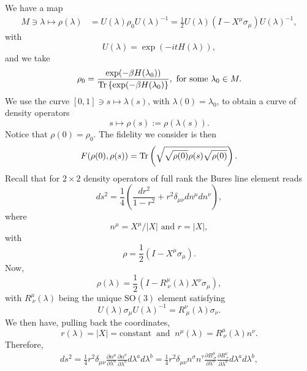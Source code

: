 We have a map
\begin{eqnarray*}
M\ni \lambda\mapsto \rho(\lambda)&=U(\lambda)\rho_0U(\lambda)^{-1}=\frac{1}{2}U(\lambda)\left(I -X^\mu\sigma_\mu\right)U(\lambda)^{-1},
\end{eqnarray*}
with
\begin{equation*}
U(\lambda)=\exp(-itH(\lambda)),
\end{equation*}
and we take
\begin{equation*}
\rho_0=\frac{\exp(-\beta H(\lambda_{0}))}{\text{Tr}\left\{\exp(-\beta H(\lambda_{0})\right\}}, \text{ for some }\lambda_0\in M.
\end{equation*}
We use the curve $[0,1] \ni s\mapsto \lambda(s)$, with $\lambda(0)=\lambda_0$, to obtain a curve of density operators
\begin{equation*}
s\mapsto \rho(s):=\rho(\lambda(s)).
\end{equation*}
Notice that $\rho(0)=\rho_0$. The fidelity we consider is then
\begin{equation*}
F(\rho(0),\rho(s))=\text{Tr}\left(\sqrt{\sqrt{\rho(0)}\rho(s)\sqrt{\rho(0)}}\right).	
\end{equation*}
Recall that for $2\times 2$ density operators of full rank the Bures line element reads
\begin{equation*}
ds^2=\frac{1}{4}\left(\frac{dr^2}{1-r^2}+ r^2 \delta_{\mu\nu} dn^{\mu}dn^{\nu}\right),
\end{equation*}
where
\begin{equation*}
n^{\mu}=X^{\mu}/|X| \text{ and } r=|X|,
\end{equation*}
with
\begin{equation*}
\rho= \frac{1}{2}\left(I-X^{\mu}\sigma_\mu\right).
\end{equation*}
Now,
\begin{equation*}
\rho(\lambda)=\frac{1}{2}\left(I- R^{\mu}_{\ \nu}(\lambda) X^{\nu}\sigma_{\mu}\right),
\end{equation*}
with $R^{\mu}_{\ \nu}(\lambda)$ being the unique $\text{SO}(3)$ element satisfying
\begin{equation*}
U(\lambda)\sigma_{\mu}U(\lambda)^{-1}=R_{\ \mu}^{\nu}(\lambda)\sigma_{\nu}.
\end{equation*}
We then have, pulling back the coordinates,
\begin{equation*}
r(\lambda)=|X|=\text{constant} \  \text{ and } \  n^{\mu}(\lambda)=R^{\mu}_{\ \nu}(\lambda)n^{\nu}.
\end{equation*}
Therefore,
\begin{eqnarray*}
ds^2=\frac{1}{4}r^2\delta_{\mu\nu}\frac{\partial n^{\mu}}{\partial \lambda^{a}}\frac{\partial n^{\nu}}{\partial \lambda^{b}}d\lambda^{a}d\lambda^{b}=\frac{1}{4}r^2\delta_{\mu\nu}n^{\sigma}n^{\tau}\frac{\partial R^{\mu}_{\ \sigma}}{\partial \lambda^{a}}\frac{\partial R^{\nu}_{\ \tau}}{\partial \lambda^{b}}d\lambda^{a}d\lambda^{b},
\end{eqnarray*}
